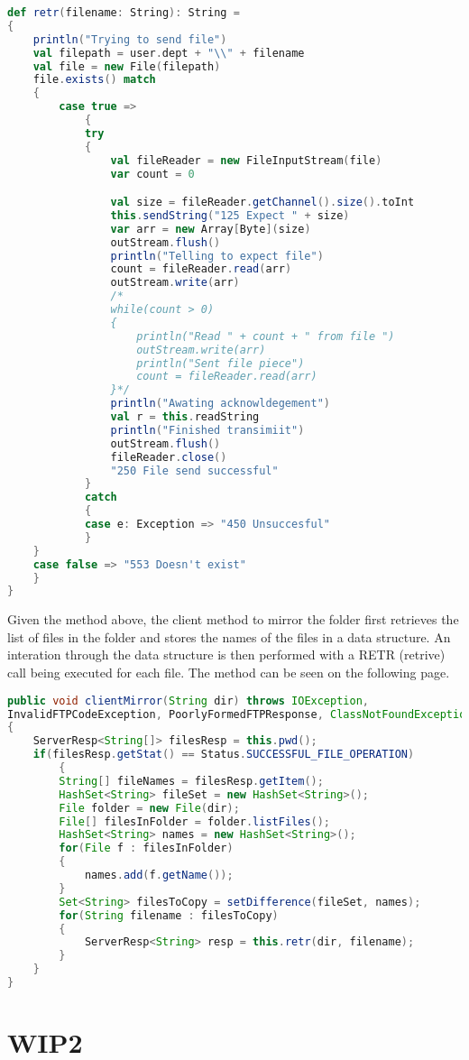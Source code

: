 \begin{lstlisting}[language=Scala, caption=File rename operation, showstringspaces=false, tabsize=2]
def retr(filename: String): String =
{
	println("Trying to send file")
	val filepath = user.dept + "\\" + filename
	val file = new File(filepath)
	file.exists() match
	{
		case true =>
			{
			try
			{
				val fileReader = new FileInputStream(file)
				var count = 0

				val size = fileReader.getChannel().size().toInt
				this.sendString("125 Expect " + size)
				var arr = new Array[Byte](size)
				outStream.flush()
				println("Telling to expect file")
				count = fileReader.read(arr)
				outStream.write(arr)
				/*
				while(count > 0)
				{
					println("Read " + count + " from file ")
					outStream.write(arr)
					println("Sent file piece")
					count = fileReader.read(arr)
				}*/
				println("Awating acknowldegement")
				val r = this.readString
				println("Finished transimiit")
				outStream.flush()
				fileReader.close()
				"250 File send successful"
			}
			catch
			{
			case e: Exception => "450 Unsuccesful"
			}
	}
	case false => "553 Doesn't exist"
	}
}

\end{lstlisting}

Given the method above, the client method to mirror the folder first retrieves the list of files in the folder and stores the names of the files
in a data structure. An interation through the data structure is then performed with a RETR (retrive) call being executed for each file. The method can be seen on the following page.\newpage

\begin{lstlisting}[language=Java, caption=Folder Mirroring, showstringspaces=false, tabsize=2]
public void clientMirror(String dir) throws IOException,
InvalidFTPCodeException, PoorlyFormedFTPResponse, ClassNotFoundException
{
	ServerResp<String[]> filesResp = this.pwd();
	if(filesResp.getStat() == Status.SUCCESSFUL_FILE_OPERATION)
		{
		String[] fileNames = filesResp.getItem();
		HashSet<String> fileSet = new HashSet<String>();
		File folder = new File(dir);
		File[] filesInFolder = folder.listFiles();
		HashSet<String> names = new HashSet<String>();
		for(File f : filesInFolder)
		{
			names.add(f.getName());
		}
		Set<String> filesToCopy = setDifference(fileSet, names);
		for(String filename : filesToCopy)
		{
			ServerResp<String> resp = this.retr(dir, filename);
		}
	}
}
\end{lstlisting}
\section{WIP2}
